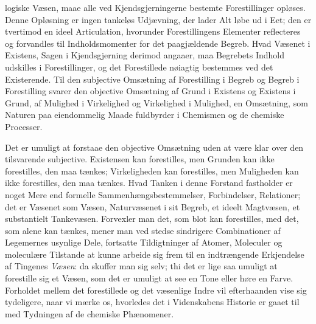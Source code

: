 \documentclass[12pt,a4paper]{book}
\begin{document}
logiske Væsen, maae alle ved Kjendsgjerningerne bestemte Forestillinger
opløses. Denne Opløsning er ingen tankeløs Udjævning, der lader Alt løbe
ud i Eet; den er tvertimod en ideel Articulation, hvorunder Forestillingens
Elementer reflecteres og forvandles til Indholdsmomenter for det
paagjældende Begreb. Hvad Væsenet i Existens, Sagen i Kjendsgjerning
derimod angaaer, maa Begrebets Indhold udskilles i Forestillinger, og det
Forestillede nøiagtig bestemmes ved det Existerende. Til den subjective
Omsætning af Forestilling i Begreb og Begreb i Forestilling svarer den
objective Omsætning af Grund i Existens og Existens i Grund, af Mulighed i
Virkelighed og Virkelighed i Mulighed, en Omsætning, som Naturen paa
eiendommelig Maade fuldbyrder i Chemismen og de chemiske Processer.

Det er umuligt at forstaae den objective Omsætning uden at være klar over
den tilsvarende subjective. Existensen kan forestilles, men Grunden kan
ikke forestilles, den maa tænkes; Virkeligheden kan forestilles, men
Muligheden kan ikke forestilles, den maa tænkes. Hvad Tanken i denne
Forstand fastholder er noget Mere end formelle Sammenhængsbestemmelser,
Forbindelser, Relationer; det er Væsenet som Væsen, Naturvæsenet i sit
Begreb, et ideelt Magtvæsen, et substantielt Tankevæsen. Forvexler man
det, som blot kan forestilles, med det, som alene kan tænkes, mener man
ved stedse sindrigere Combinationer af Legemernes usynlige Dele, fortsatte
Tildigtninger af Atomer, Moleculer og moleculære Tilstande at kunne
arbeide sig frem til en indtrængende Erkjendelse af Tingenes
\emph{Væsen}: da skuffer man sig selv; thi det er lige saa umuligt at
forestille sig et Væsen, som det er umuligt at see en Tone eller høre en
Farve.
Forholdet mellem det forestillede og det væsenlige Indre vil efterhaanden
vise sig tydeligere, naar vi mærke os, hvorledes det i Videnskabens
Historie er gaaet til med Tydningen af de chemiske Phænomener.
\end{document}
